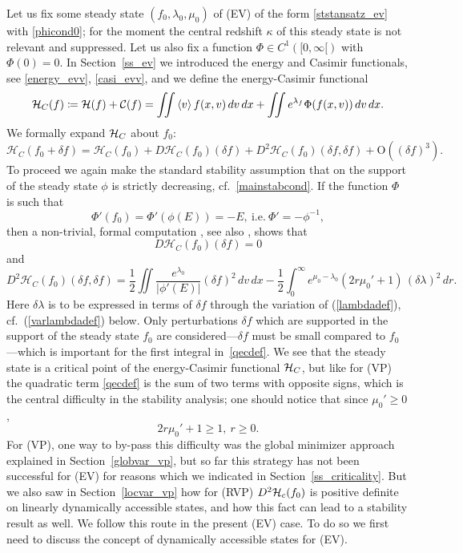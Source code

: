 \documentclass[11pt]{article}
\begin{document}
Let us fix some steady state $(f_0,\lambda_0,\mu_0)$ of (EV) of the form
\eqref{ststansatz_ev} with \eqref{phicond0}; for the moment the central
redshift $\kappa$ of this steady state is not relevant and suppressed.
Let us also fix a function $\Phi\in C^1([0,\infty[)$ with $\Phi(0)=0$.
In Section~\ref{ss_ev} we introduced the energy and Casimir functionals,    
see \eqref{energy_evv}, \eqref{casi_evv}, and we define
the energy-Casimir functional
\[
{\cal H}_C (f)
\coloneqq
{\cal H} (f) + {\cal C} (f)
=
\iint \left\langle v\right\rangle f(x,v)\,dv\,dx + \iint e^{\lambda_f} \Phi(f(x,v))\,dv\,dx.
\]
We formally expand ${\cal H}_C$ about $f_0$:
\[ 
\mathcal{H}_C (f_0+\delta f) = 
\mathcal{H}_C (f_0)+D\mathcal{H}_C(f_0)(\delta f)
+ D^2\mathcal{H}_C(f_0)(\delta f,\delta f) + \mathrm{O}((\delta f)^3).
\]
To proceed we again make the standard stability assumption
that on the support of the steady state $\phi$ is strictly decreasing,
cf.~\eqref{mainstabcond}.
If the function $\Phi$ is such that
\[
\Phi'(f_0) = \Phi' (\phi(E)) = - E,\ \mbox{i.e.}\ \Phi' = - \phi^{-1},
\]
then a non-trivial, formal computation \cite{HaRe2013},
see also \cite{KM}, shows that
\[
D\mathcal{H}_C(f_0)(\delta f) =0
\]
and
\begin{equation}\label{qecdef}
  D^2\mathcal{H}_C(f_0)(\delta f,\delta f)
  =
  \frac{1}{2}\iint \frac{e^{\lambda_0}}{|\phi'(E)|}(\delta f)^2\,dv\,dx
  - \frac{1}{2}\int_0^\infty e^{\mu_0 - \lambda_0}
  \left(2 r \mu_0' +1\right)\, (\delta\lambda)^2\,dr.
\end{equation}
Here $\delta\lambda$ is to be expressed in terms of $\delta f$ through the
variation of (\ref{lambdadef}), cf.\ (\ref{varlambdadef}) below.
Only perturbations $\delta f$ which are supported in the support
of the steady state $f_0$ are considered---$\delta f$ must
be small compared to $f_0$---which is important for the
first integral in~\eqref{qecdef}.
We see that the steady state is a critical point of the
energy-Casimir functional ${\cal H}_C$, but like for (VP) the quadratic term
\eqref{qecdef} is the sum of two terms with opposite signs,
which is the central difficulty in the stability analysis;
one should notice that since $\mu_0' \geq 0$,
\begin{equation}\label{muprtermpos}
2 r \mu_0' +1 \geq 1,\ r\geq 0.
\end{equation}
For (VP), one way to by-pass this difficulty was the global
minimizer approach explained in Section~\ref{globvar_vp},
but so far this strategy has not been successful for (EV)
for reasons which we indicated in Section~\ref{ss_criticality}.
But we also saw in Section~\ref{locvar_vp} how for (RVP)
$D^2 {\cal H}_c(f_0)$ is
positive definite on linearly dynamically
accessible states, and how this fact can lead to a stability result
as well. We follow this route in the present (EV) case.
To do so we first need to discuss the concept of dynamically accessible
states for (EV).
\end{document}
